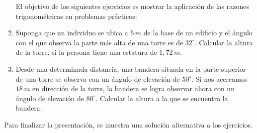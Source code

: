 \documentclass[12pt]{article}
\begin{document}
\begin{enumerate}[leftmargin=*]
\begin{center}
\end{center}
El objetivo de los siguientes ejercicios es mostrar la aplicaci\'on de las razones trigonom\'etricas en problemas pr\'acticos:
\item Suponga que un individuo se ubica a $5 \, m$ de la base de un edificio y el \'angulo con el que observa la parte m\'as alta  de una torre es de $32^\circ$. Calcular la altura de la torre, si la persona tiene una estatura de $1,72 \, m$.
\item 
Desde una determinada distancia, una bandera situada en la parte superior de una torre se observa con un ángulo de elevaci\'on de $50^\circ$. Si nos acercamos $18 \, m$  en direcci\'on de la torre, la bandera se logra observar ahora con un ángulo de elevaci\'on 
 de $80^\circ$. Calcular la altura a la que se encuentra la bandera.


\end{enumerate}
Para finalizar la presentaci\'on, se muestra una soluci\'on alternativa a los ejercicios.
\end{document}
